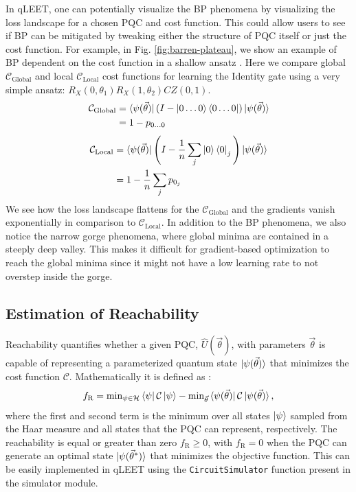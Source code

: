 In qLEET, one can potentially visualize the BP phenomena by visualizing the loss landscape for a chosen PQC and cost function. This could allow users to see if BP can be mitigated by tweaking either the structure of PQC itself or just the cost function. For example, in Fig. \ref{fig:barren-plateau}, we show an example of BP dependent on the cost function in a shallow ansatz \cite{s41467-021-21728-w}. Here we compare global $\mathcal{C}_{\text{Global}}$ and local $\mathcal{C}_{\text{Local}}$ cost functions for learning the Identity gate using a very simple ansatz: $R_X(0,\theta_1)R_X(1, \theta_2)CZ(0, 1)$. 
\begin{equation}
\begin{split}
    \mathcal{C}_{\text{Global}} &= \bra{\psi(\vec{\theta})} (I - \ket{0\ldots0}\bra{0\ldots0}) \ket{\psi(\vec{\theta})} \\
    &= 1 - p_{0\ldots0}
\end{split}
\end{equation}
\begin{equation}
\begin{split}
    \mathcal{C}_{\text{Local}} &= \bra{\psi(\vec{\theta})} \Bigg(I - \frac{1}{n}\sum_j \ket{0}\bra{0}_j\Bigg) \ket{\psi(\vec{\theta})} \\
    &= 1 - \frac{1}{n}\sum_j p_{0_j}
\end{split}
\end{equation}
We see how the loss landscape flattens for the $\mathcal{C}_{\text{Global}}$ and the gradients vanish exponentially in comparison to  $\mathcal{C}_{\text{Local}}$. In addition to the BP phenomena, we also notice the narrow gorge phenomena, where global minima are contained in a steeply deep valley. This makes it difficult for gradient-based optimization to reach the global minima since it might not have a low learning rate to not overstep inside the gorge. 

\subsection{Estimation of Reachability}

Reachability quantifies whether a given PQC, $\hat{U}(\vec{\theta})$, with parameters $\vec{\theta}$ is capable of representing a parameterized quantum state $\ket{\psi(\vec{\theta})}$ that minimizes the cost function $\mathcal{C}$. Mathematically it is defined as \cite{PhysRevLett.124.090504}:
\begin{equation}
f_\text{R}=\text{min}_{\psi\in\mathcal{H}}\bra{\psi}\mathcal{C}\ket{\psi}-\text{min}_{\vec{\theta}}\bra{\psi(\vec{\theta})}\mathcal{C}\ket{\psi(\vec{\theta})},
\end{equation}
where the first and second term is the minimum over all states $\ket{\psi}$ sampled from the Haar measure and all states that the PQC can represent, respectively. The reachability is equal or greater than zero $f_\text{R}\ge0$, with $f_\text{R}=0$ when the PQC can generate an optimal state $\ket{\psi(\vec{\theta}^*)}$ that minimizes the objective function. This can be easily implemented in qLEET using the \texttt{CircuitSimulator} function present in the simulator module.  

